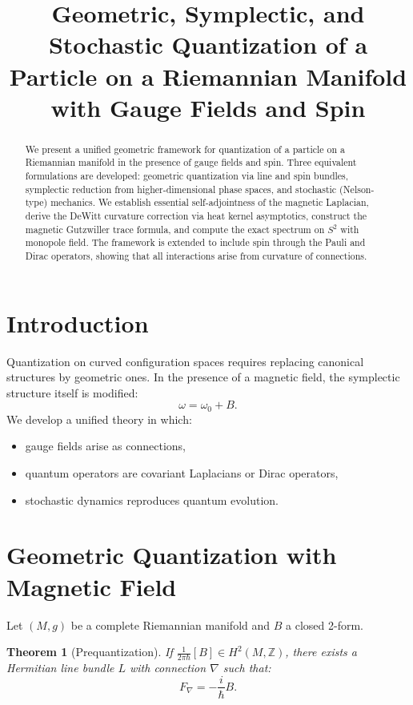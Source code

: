 \documentclass[11pt]{article}
\title{\textbf{Geometric, Symplectic, and Stochastic Quantization of a Particle on a Riemannian Manifold with Gauge Fields and Spin}}
\author{}
\date{}
\newtheorem{theorem}{Theorem}[section]
\begin{document}
\maketitle

\begin{abstract}
We present a unified geometric framework for quantization of a particle on a Riemannian manifold in the presence of gauge fields and spin. Three equivalent formulations are developed: geometric quantization via line and spin bundles, symplectic reduction from higher-dimensional phase spaces, and stochastic (Nelson-type) mechanics. We establish essential self-adjointness of the magnetic Laplacian, derive the DeWitt curvature correction via heat kernel asymptotics, construct the magnetic Gutzwiller trace formula, and compute the exact spectrum on $S^2$ with monopole field. The framework is extended to include spin through the Pauli and Dirac operators, showing that all interactions arise from curvature of connections.
\end{abstract}

\tableofcontents

\section{Introduction}

Quantization on curved configuration spaces requires replacing canonical structures by geometric ones. In the presence of a magnetic field, the symplectic structure itself is modified:
\[
\omega = \omega_0 + B.
\]
We develop a unified theory in which:
\begin{itemize}
\item gauge fields arise as connections,
\item quantum operators are covariant Laplacians or Dirac operators,
\item stochastic dynamics reproduces quantum evolution.
\end{itemize}

\section{Geometric Quantization with Magnetic Field}

Let $(M,g)$ be a complete Riemannian manifold and $B$ a closed 2-form.

\begin{theorem}[Prequantization]
If $\frac{1}{2\pi\hbar}[B]\in H^2(M,\mathbb{Z})$, there exists a Hermitian line bundle $L$ with connection $\nabla$ such that:
\[
F_\nabla = -\frac{i}{\hbar}B.
\]
\end{theorem}
\end{document}

